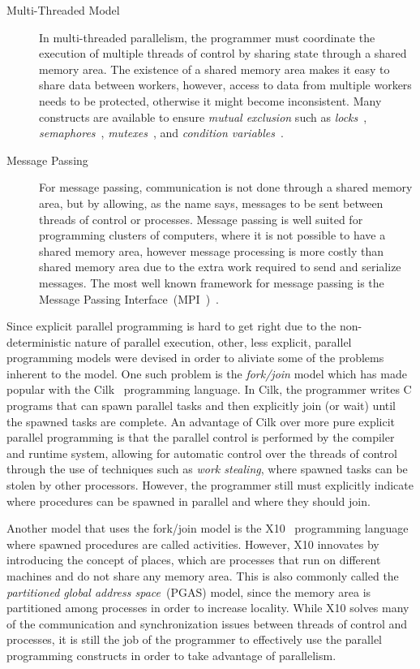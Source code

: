 \begin{description}

   \item[Multi-Threaded Model] In multi-threaded parallelism, the programmer
      must coordinate the execution of multiple threads of control by sharing
      state through a shared memory area. The existence of a shared memory area
      makes it easy to share data between workers, however, access to data from
      multiple workers needs to be protected, otherwise it might become
      inconsistent. Many constructs are available to ensure \emph{mutual
      exclusion} such as \emph{locks}~\cite{Silberschatz:2008},
      \emph{semaphores}~\cite{Dijkstra:2002},
      \emph{mutexes}~\cite{Silberschatz:2008}, and \emph{condition
      variables}~\cite{Hoare:1974}.

   \item[Message Passing] For message passing, communication is not done through a
      shared memory area, but by allowing, as the name says, messages to be sent
      between threads of control or processes. Message passing is well suited for
      programming clusters of computers, where it is not possible to have a shared
      memory area, however message processing is more costly than shared memory
      area due to the extra work required to send and serialize messages.  The most
      well known framework for message passing is the Message Passing
      Interface~(MPI~)~\cite{Forum:1994}.

\end{description}


Since explicit parallel programming is hard to get right due to the
non-deterministic nature of parallel execution, other, less explicit, parallel
programming models were devised in order to aliviate some of the problems
inherent to the model. One such problem is the \emph{fork/join} model which has
made popular with the Cilk~\cite{Bluemofe:1995:CEM:209936.209958} programming
language. In Cilk, the programmer writes C programs that can spawn parallel
tasks and then explicitly join (or wait) until the spawned tasks are complete.
An advantage of Cilk over more pure explicit parallel programming is that the
parallel control is performed by the compiler and runtime system, allowing for
automatic control over the threads of control through the use of techniques such
as \emph{work stealing}, where spawned tasks can be stolen by other processors.
However, the programmer still must explicitly indicate where procedures can be
spawned in parallel and where they should join.

Another model that uses the fork/join model is the
X10~\cite{Charles:2005:XOA:1094811.1094852} programming language where spawned
procedures are called activities. However, X10 innovates by introducing the
concept of places, which are processes that run on different machines and do not
share any memory area. This is also commonly called the \emph{partitioned global
address space}~(PGAS) model, since the memory area is partitioned among
processes in order to increase locality. While X10 solves many of the
communication and synchronization issues between threads of control and
processes, it is still the job of the programmer to effectively use the parallel
programming constructs in order to take advantage of parallelism.
